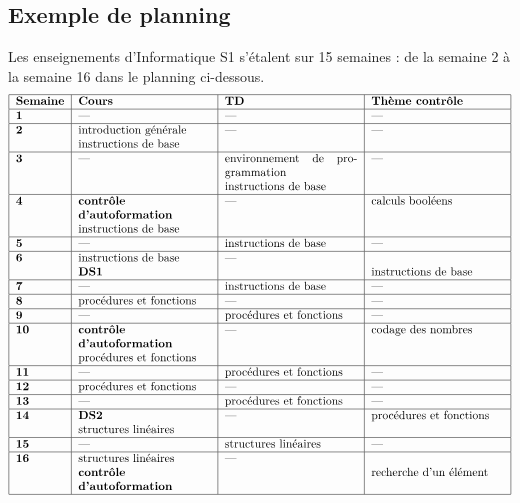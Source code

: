 \newpage
\subsection{Exemple de planning}\label{annexe:planning}
Les enseignements d'Informatique S1 s'étalent sur 15 semaines :
de la semaine 2 à la semaine 16 dans le planning ci-dessous.
$$\begin{tabular}{|l|p{4cm}|p{4cm}|p{4cm}|}
\hline
\bf Semaine & \bf Cours & \bf TD & \bf Thème contrôle \\
\hline
\bf 1 & --- & --- & --- \\
\hline
\bf 2 & introduction générale\newline instructions de base & ---  & --- \\
\hline
\bf 3 & --- & environnement de pro\-grammation\newline instructions de base & ---  \\
\hline
\bf 4 & {\bf contrôle d'autoformation}\newline instructions de base & --- & calculs booléens\\
\hline
\bf 5 & --- & instructions de base & --- \\
\hline
\bf 6 & instructions de base \newline {\bf DS1} & --- & \mbox{}\newline instructions de base \\
\hline
\bf 7 & --- & instructions de base & --- \\
\hline
\bf 8 & procédures et fonctions & --- & --- \\
\hline
\bf 9 & --- & procédures et fonctions & --- \\
\hline
\bf 10 & {\bf contrôle d'autoformation}\newline procédures et fonctions & --- & codage des
nombres\\
\hline
\bf 11 & --- & procédures et fonctions & --- \\
\hline
\bf 12 & procédures et fonctions & --- & --- \\
\hline
\bf 13 & --- & procédures et fonctions & --- \\
\hline
\bf 14 & {\bf DS2}\newline structures linéaires & --- & procédures et fonctions\\
\hline
\bf 15 & --- &  structures linéaires & ---\\
\hline
\bf 16 & structures linéaires\newline {\bf contrôle d'autoformation} & --- & \mbox{}\newline recherche d'un élément \\
\hline
\end{tabular}$$

